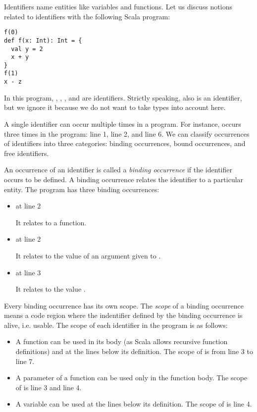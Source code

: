Identifiers name entities like variables and functions.
Let us discuss notions related to identifiers with the following Scala program:

\begin{verbatim}
f(0)
def f(x: Int): Int = {
  val y = 2
  x + y
}
f(1)
x - z
\end{verbatim}

In this program, , , , and  are identifiers. Strictly speaking,
 also is an identifier, but we ignore it because we do not want to take
types into account here.

A single identifier can occur multiple times in a program. For instance,
 occurs three times in the program: line 1, line 2, and line 6.
We can classify occurrences of identifiers into three categories:
binding occurrences, bound occurrences, and free identifiers.

An occurrence of an identifier is called a \textit{binding occurrence}
if the identifier occurs to be defined. A binding occurrence relates the
identifier to a particular entity. The program has three binding occurrences:

\begin{itemize}
  \item {} at line 2

    It relates  to a function.

  \item {} at line 2

    It relates  to the value of an argument given to .

  \item {} at line 3

    It relates  to the value .
\end{itemize}

Every binding occurrence has its own scope. The \textit{scope} of a binding
occurrence means a code region where the indentifier defined by the binding
occurrence is alive, i.e. usable. The scope of each identifier in the program is as follows:

\begin{itemize}
  \item {}

    A function can be used in its body (as Scala allows recursive function
    definitions) and at the lines below its definition. The scope of
     is from line 3 to line 7.

  \item {}

    A parameter of a function can be used only in the function body. The scope of
     is line 3 and line 4.

  \item {}

    A variable can be used at the lines below its definition. The scope of
     is line 4.
\end{itemize}

